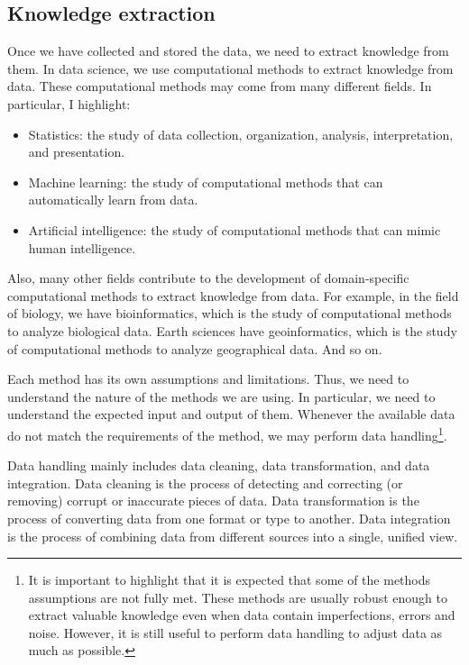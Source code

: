 \subsection{Knowledge extraction}

Once we have collected and stored the data, we need to extract knowledge from them.  In
data science, we use computational methods to extract knowledge from data.  These
computational methods may come from many different fields.  In particular, I highlight:
\begin{itemize}
  \item Statistics: the study of data collection, organization, analysis, interpretation,
    and presentation.
  \item Machine learning: the study of computational methods that can automatically learn from data.
  \item Artificial intelligence: the study of computational methods that can mimic human
    intelligence.
\end{itemize}

Also, many other fields contribute to the development of domain-specific computational
methods to extract knowledge from data.  For example, in the field of biology, we have
bioinformatics, which is the study of computational methods to analyze biological data.
Earth sciences have geoinformatics, which is the study of computational methods to
analyze geographical data.  And so on.

Each method has its own assumptions and limitations.  Thus, we need to understand the
nature of the methods we are using.  In particular, we need to understand the
expected input and output of them.  Whenever the available data do not match the
requirements of the method, we may perform data handling\footnote{%
  It is important to highlight that it is expected that some of the methods assumptions
  are not fully met.  These methods are usually robust enough to extract valuable
  knowledge even when data contain imperfections, errors and noise.  However, it is still
  useful to perform data handling to adjust data as much as possible.%
}.

Data handling mainly includes data cleaning, data transformation, and data
integration. Data cleaning is the process of detecting and correcting (or removing)
corrupt or inaccurate pieces of data.  Data transformation is the process of converting
data from one format or type to another.  Data integration is the process of combining
data from different sources into a single, unified view.

